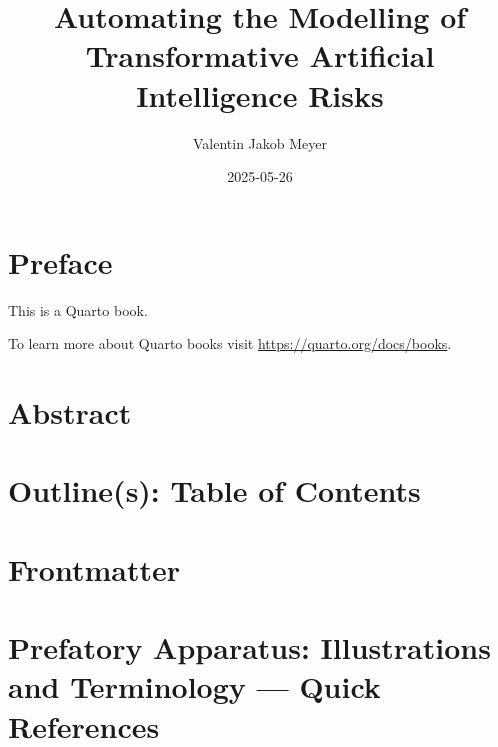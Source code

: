 \documentclass[
  letterpaper,
]{book}
\title{Automating the Modelling of Transformative Artificial
Intelligence Risks}
\author{Valentin Jakob Meyer}
\date{2025-05-26}
\renewcommand*\contentsname{Table of contents}
\newcommand\contentsname{Table of contents}
\begin{document}
\frontmatter
\maketitle

\renewcommand*\contentsname{Table of contents}
{
\setcounter{tocdepth}{2}
\tableofcontents
}

\mainmatter
{}

\chapter*{Preface}\label{preface}


This is a Quarto book.

To learn more about Quarto books visit
\url{https://quarto.org/docs/books}.


\chapter*{Abstract}\label{sec-Abstract}



\chapter*{Outline(s): Table of Contents}\label{sec-ToC}



\chapter*{Frontmatter}\label{frontmatter}



\chapter*{Prefatory Apparatus: Illustrations and Terminology --- Quick
References}\label{prefatory-apparatus-illustrations-and-terminology-quick-references}
\end{document}
